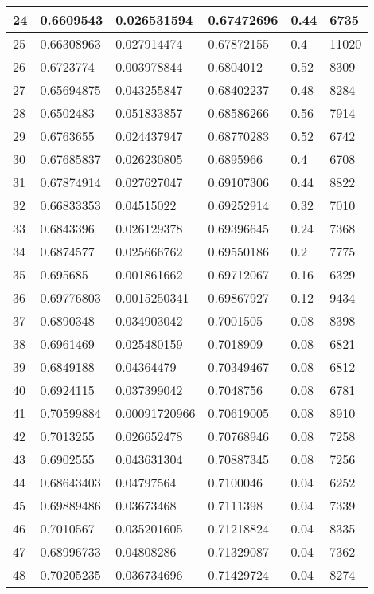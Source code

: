 \begin{longtable}{|l|l|l|l|l|l|}
24 & 0.6609543 & 0.026531594 & 0.67472696 & 0.44 & 6735 \\ \hline 
25 & 0.66308963 & 0.027914474 & 0.67872155 & 0.4 & 11020 \\ \hline 
26 & 0.6723774 & 0.003978844 & 0.6804012 & 0.52 & 8309 \\ \hline 
27 & 0.65694875 & 0.043255847 & 0.68402237 & 0.48 & 8284 \\ \hline 
28 & 0.6502483 & 0.051833857 & 0.68586266 & 0.56 & 7914 \\ \hline 
29 & 0.6763655 & 0.024437947 & 0.68770283 & 0.52 & 6742 \\ \hline 
30 & 0.67685837 & 0.026230805 & 0.6895966 & 0.4 & 6708 \\ \hline 
31 & 0.67874914 & 0.027627047 & 0.69107306 & 0.44 & 8822 \\ \hline 
32 & 0.66833353 & 0.04515022 & 0.69252914 & 0.32 & 7010 \\ \hline 
33 & 0.6843396 & 0.026129378 & 0.69396645 & 0.24 & 7368 \\ \hline 
34 & 0.6874577 & 0.025666762 & 0.69550186 & 0.2 & 7775 \\ \hline 
35 & 0.695685 & 0.001861662 & 0.69712067 & 0.16 & 6329 \\ \hline 
36 & 0.69776803 & 0.0015250341 & 0.69867927 & 0.12 & 9434 \\ \hline 
37 & 0.6890348 & 0.034903042 & 0.7001505 & 0.08 & 8398 \\ \hline 
38 & 0.6961469 & 0.025480159 & 0.7018909 & 0.08 & 6821 \\ \hline 
39 & 0.6849188 & 0.04364479 & 0.70349467 & 0.08 & 6812 \\ \hline 
40 & 0.6924115 & 0.037399042 & 0.7048756 & 0.08 & 6781 \\ \hline 
41 & 0.70599884 & 0.00091720966 & 0.70619005 & 0.08 & 8910 \\ \hline 
42 & 0.7013255 & 0.026652478 & 0.70768946 & 0.08 & 7258 \\ \hline 
43 & 0.6902555 & 0.043631304 & 0.70887345 & 0.08 & 7256 \\ \hline 
44 & 0.68643403 & 0.04797564 & 0.7100046 & 0.04 & 6252 \\ \hline 
45 & 0.69889486 & 0.03673468 & 0.7111398 & 0.04 & 7339 \\ \hline 
46 & 0.7010567 & 0.035201605 & 0.71218824 & 0.04 & 8335 \\ \hline 
47 & 0.68996733 & 0.04808286 & 0.71329087 & 0.04 & 7362 \\ \hline 
48 & 0.70205235 & 0.036734696 & 0.71429724 & 0.04 & 8274 \\ \hline 

\end{longtable}
